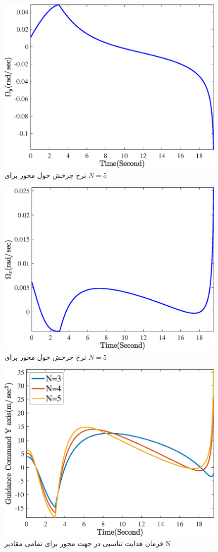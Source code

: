 \begin{figure}[H]
	\centering
	\includegraphics[width=.75\linewidth]{../Figure/Q1/b/Omega_y_5}
	\caption{ نرخ چرخش حول محور
		برای 
		$N=5$}
\end{figure}

\begin{figure}[H]
	\centering
	\includegraphics[width=.75\linewidth]{../Figure/Q1/b/Omega_z_5}
	\caption{ نرخ چرخش حول محور
		برای 
		$N=5$}
\end{figure}


\begin{figure}[H]
	\centering
	\includegraphics[width=.75\linewidth]{../Figure/Q1/b/GC_y}
	\caption{فرمان هدایت تناسبی در جهت محور
		برای 
		تمامی مقادیر N}
\end{figure}

